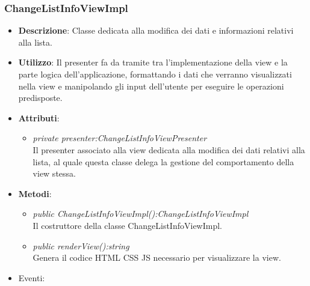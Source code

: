 \subsubsection{ChangeListInfoViewImpl}
\begin{itemize}
\item \textbf{Descrizione}: Classe dedicata alla modifica dei dati e informazioni relativi alla lista.
\item \textbf{Utilizzo}: Il presenter fa da tramite tra l'implementazione della view e la parte logica dell'applicazione, formattando i dati che verranno visualizzati nella view e manipolando gli input dell'utente per eseguire le operazioni predisposte.
\item \textbf{Attributi}: 
	\begin{itemize}
	\item \textit{private presenter:ChangeListInfoViewPresenter}\\
	Il presenter associato alla view dedicata alla modifica dei dati relativi alla lista, al quale questa classe delega la gestione del comportamento della view stessa.
	\end{itemize}
\item \textbf{Metodi}:
	\begin{itemize}
	\item \textit{public ChangeListInfoViewImpl():ChangeListInfoViewImpl}\\
	Il costruttore della classe ChangeListInfoViewImpl.	
	\item \textit{public renderView():string}\\
	Genera il codice HTML CSS JS necessario per visualizzare la view.
	\end{itemize}
\item{Eventi}:
\end{itemize}

